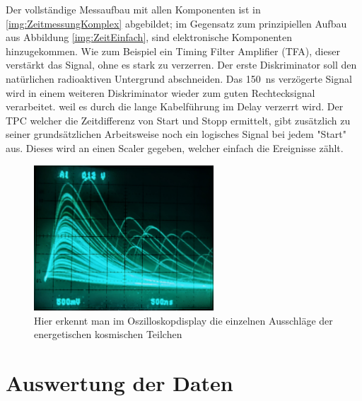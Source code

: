 \documentclass[12pt,a4paper,ngerman]{report}
\begin{document}
	Der vollständige Messaufbau mit allen Komponenten ist in \ref{img:ZeitmessungKomplex} abgebildet; im Gegensatz zum prinzipiellen Aufbau aus Abbildung \ref{img:ZeitEinfach}, sind elektronische Komponenten hinzugekommen. Wie zum Beispiel ein Timing Filter Amplifier (TFA), dieser verstärkt das Signal, ohne es stark zu verzerren. Der erste Diskriminator soll den natürlichen radioaktiven Untergrund abschneiden. Das \SI{150}{\nano \second} verzögerte Signal wird in einem weiteren Diskriminator wieder zum guten Rechtecksignal verarbeitet. weil es durch die lange Kabelführung im Delay verzerrt wird. Der TPC welcher die Zeitdifferenz von Start und Stopp ermittelt, gibt zusätzlich zu seiner grundsätzlichen Arbeitsweise noch ein logisches Signal bei jedem "Start" aus. Dieses wird an einen Scaler gegeben, welcher einfach die Ereignisse zählt.
	
	\begin{figure}
		\centering
		\includegraphics[width=0.6\textwidth]{Bilder/Oszi.jpg}		
		\caption[Oszilliskop]{Hier erkennt man im Oszilloskopdisplay die einzelnen Ausschläge der energetischen kosmischen Teilchen}
		\label{img:Oszi}
	\end{figure}
	
	
	


\chapter{Auswertung der Daten}
\end{document}
